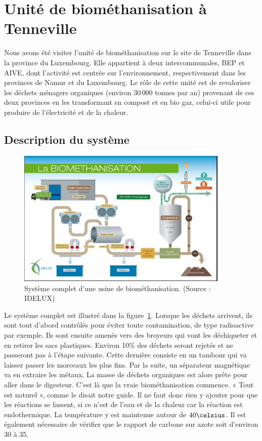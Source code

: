 \section{Unité de biométhanisation à Tenneville}

Nous avons été visiter l'unité de biométhanisation sur le site de Tenneville dans la
province du Luxembourg. Elle appartient à deux intercommunales, BEP et AIVE, dont
l'activité est centrée sur l'environnement, respectivement dans les provinces de Namur
et du Luxembourg. Le rôle de cette unité est de revaloriser les déchets ménagers
organiques (environ $30\,000$ tonnes par an) provenant de ces deux provinces en les
transformant en compost et en bio gaz, celui-ci utile pour produire de l'électricité et de la
chaleur.

\subsection{Description du système}

\begin{figure}
\centering
\includegraphics[width=0.9\textwidth]{img/biometh1}
\caption{Système complet d'une usine de biométhanisation. (Source : IDELUX)}
\label{fig:biometh1}
\end{figure}

Le système complet est illustré dans la figure~\ref{fig:biometh1}.
Lorsque les déchets arrivent, ils sont tout d'abord contrôlés pour éviter toute contamination, de type radioactive par exemple. Ils sont ensuite amenés vers des broyeurs qui vont les déchiqueter et en retirer les sacs plastiques. Environ 10\% des déchets seront rejetés et ne passeront pas à l'étape suivante. Cette dernière consiste en un tambour qui va laisser passer les morceaux les plus fins. Par la suite, un séparateur magnétique va en extraire les métaux. La masse de déchets organiques est alors prête pour aller dans le digesteur. C'est là que la vraie biométhanisation commence. « Tout est naturel », comme le disait notre guide. Il ne faut donc rien y ajouter pour que les réactions se fassent, si ce n'est de l'eau et de la chaleur car la réaction est endothermique. La température y est maintenue autour de $40\celsius$. Il est également nécessaire de vérifier que le rapport de carbone sur azote soit d'environ 30 à 35.

